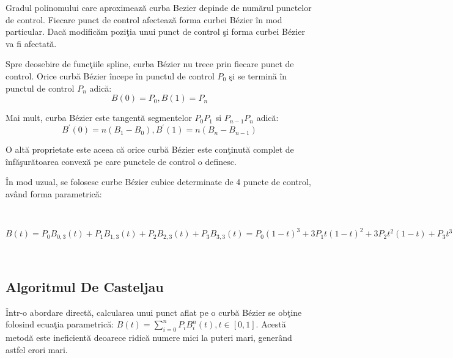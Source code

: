\documentclass{exam}
\begin{document}
Gradul polinomului care aproximează curba Bezier depinde de numărul punctelor de control. Fiecare punct de control afectează forma curbei B\'{e}zier în mod particular. Dacă modificăm poziţia unui punct de control şi forma curbei B\'{e}zier va fi afectată.

Spre deosebire de funcţiile spline, curba B\'{e}zier nu trece prin fiecare punct de control. Orice curbă B\'{e}zier începe în punctul de control $P_0$ şi se termină în punctul de control $P_n$ adică:
$$B(0) = P_0, B(1) = P_n$$

Mai mult, curba B\'{e}zier este tangentă segmentelor $P_0P_1$ si $P_{n-1}P_n$ adică:
$$B^{'}(0) = n(B_1-B_0), B^{'}(1) = n(B_n-B_{n-1})$$

O altă proprietate este aceea că orice curbă B\'{e}zier este conţinută complet de înfăşurătoarea convexă pe care punctele de control o definesc.

În mod uzual, se folosesc curbe B\'{e}zier cubice determinate de 4 puncte de control, având forma parametrică:

\begin{center}
	$B(t) = P_0B_{0,3}(t)+ P_1B_{1,3}(t)+ P_2B_{2,3}(t) + P_3B_{3,3}(t)
		= P_0(1-t)^{3}+3P_1t(1-t)^{2}+3P_2t^{2}(1-t)+P_3t^{3} =
		\begin{bmatrix}
			t^{3} & t^{2} & t & 1 \\
		\end{bmatrix}
		\begin{bmatrix}
			-1 & 3  & -3 & 1 \\
			3  & -6 & 3  & 0 \\
			-3 & 3  & 0  & 0 \\
			1  & 0  & 0  & 0 \\
		\end{bmatrix}
		\begin{bmatrix}
			P_0 \\
			P_1 \\
			P_2 \\
			P_3 \\
		\end{bmatrix}
		,  \quad  t\in[0,1]$
\end{center}

\subsection{Algoritmul De Casteljau}

Într-o abordare directă, calcularea unui punct aflat pe o curbă B\'{e}zier se obţine folosind ecuaţia parametrică: $B(t) = \sum\limits_{i=0}^n P_iB_{i}^n(t), t\in[0,1]$. Acestă metodă este ineficientă deoarece ridică numere mici la puteri mari, generând astfel erori mari.
\end{document}

